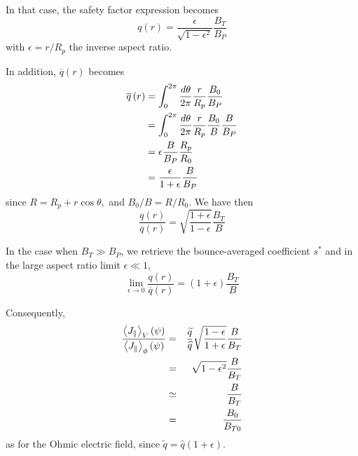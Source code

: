 \documentclass[12pt,a4paper]{article}
\begin{document}
In that case, the safety factor expression becomes 
\begin{equation}
q\left( r\right) =\frac{\epsilon}{\sqrt{1-\epsilon^{2}}}\frac{B_{T}}{B_{P}}
\label{qcirc2}
\end{equation}
with $\epsilon=r/R_{p}$ the inverse aspect ratio.

In addition, $\overline{q}\left( r\right) $ becomes 
\begin{align}
\overline{q}\left( r\right) & =\int_{0}^{2\pi}\frac{d\theta}{2\pi}\frac {r}{%
R_{p}}\frac{B_{0}}{B_{P}}  \nonumber \\
& =\int_{0}^{2\pi}\frac{d\theta}{2\pi}\frac{r}{R_{p}}\frac{B_{0}}{B}\frac {B%
}{B_{P}}  \nonumber \\
& =\epsilon\frac{B}{B_{P}}\frac{R_{p}}{R_{0}}  \nonumber \\
& =\frac{\epsilon}{1+\epsilon}\frac{B}{B_{P}}
\end{align}
since $R=R_{p}+r\cos\theta,$ and $B_{0}/B=R/R_{0}.$ We have then 
\begin{equation}
\frac{q\left( r\right) }{\overline{q}\left( r\right) }=\sqrt {\frac{
1+\epsilon}{1-\epsilon}}\frac{B_{T}}{B}
\end{equation}

In the case when $B_{T}\gg B_{P}$, we retrieve the bounce-averaged
coefficient $s^{\ast }$ and in the large aspect ratio limit $\epsilon \ll 1,$%
\begin{equation}
\lim_{\epsilon \rightarrow 0}\frac{q\left( r\right) }{\overline{q}\left(
r\right) }=\left( 1+\epsilon \right) \frac{B_{T}}{B}
\end{equation}

Consequently,%
\begin{eqnarray}
\frac{\left\langle J_{\Vert }\right\rangle _{V}\left( \psi \right) }{%
\left\langle J_{\Vert }\right\rangle _{\phi }\left( \psi \right) } &=&\frac{%
\widetilde{q}}{\widehat{q}}\sqrt{\frac{1-\epsilon }{1+\epsilon }}\frac{B}{%
B_{T}}  \nonumber \\
&=&\sqrt{1-\epsilon ^{2}}\frac{B}{B_{T}}  \nonumber \\
&\simeq &\frac{B}{B_{T}}  \nonumber \\
&=&\frac{B_{0}}{B_{T0}}
\end{eqnarray}%
as for the Ohmic electric field, since $\widetilde{q}=\widehat{q}\left(
1+\epsilon \right) .$
\end{document}
